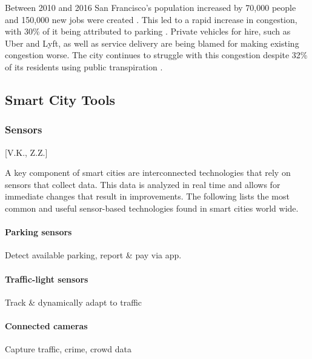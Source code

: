 \documentclass[12pt]{article}                       %
\begin{document}
Between 2010 and 2016 San Francisco's population increased by 70,000 people and 150,000 new jobs were created \cite{Marshall2018UberComplicated}. This led to a rapid increase in congestion, with 30\% of it being attributed to parking \cite{Marshall2018UberComplicated}. Private vehicles for hire, such as Uber and Lyft, as well as service delivery are being blamed for making existing congestion worse. The city continues to struggle with this congestion despite 32\% of its residents using public transpiration \cite{Marshall2018UberComplicated}. 

\subsection{Smart City Tools}
\subsubsection{Sensors}[V.K., Z.Z.]


A key component of smart cities are interconnected technologies that rely on sensors that collect data. This data is analyzed in real time and allows for immediate changes that result in improvements. The following lists the most common and useful sensor-based technologies found in smart cities world wide. 

\paragraph{Parking sensors} Detect available parking, report \& pay via app.

\paragraph{Traffic-light sensors} Track \& dynamically adapt to traffic


\paragraph{Connected cameras} Capture traffic, crime, crowd data
\end{document}
